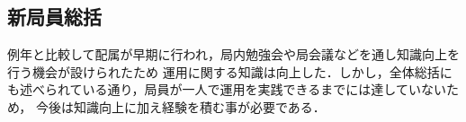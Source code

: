 \subsection*{新局員総括}

例年と比較して配属が早期に行われ，局内勉強会や局会議などを通し知識向上を行う機会が設けられたため
運用に関する知識は向上した．しかし，全体総括にも述べられている通り，局員が一人で運用を実践できるまでには達していないため，
今後は知識向上に加え経験を積む事が必要である．